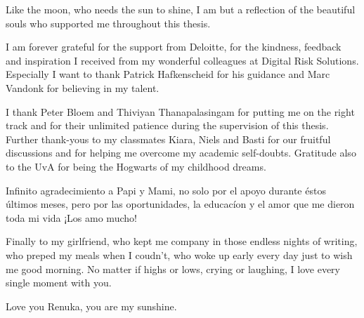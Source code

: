Like the moon, who needs the sun to shine, I am but a reflection of the beautiful souls who supported me throughout this thesis.

I am forever grateful for the support from Deloitte, for the kindness, feedback and inspiration I received from my wonderful colleagues at Digital Risk Solutions. Especially I want to thank Patrick Hafkenscheid for his guidance and Marc Vandonk for believing in my talent.

I thank Peter Bloem and Thiviyan Thanapalasingam for putting me on the right track and for their unlimited patience during the supervision of this thesis. Further thank-yous to my classmates Kiara, Niels and Basti for our fruitful discussions and for helping me overcome my academic self-doubts. Gratitude also to the UvA for being the Hogwarts of my childhood dreams.

Infinito agradecimiento a Papi y Mami, no solo por el apoyo durante \'{e}stos \'{u}ltimos meses, pero por las oportunidades, la educac\'ion y el amor que me dieron toda mi vida ¡Los amo mucho!

Finally to my girlfriend, who kept me company in those endless nights of writing, who preped my meals when I coudn't, who woke up early every day just to wish me good morning. 
No matter if highs or lows, crying or laughing, I love every single moment with you. 

\begin{center}
    Love you Renuka, you are my sunshine. \\\emojisun 
\end{center}